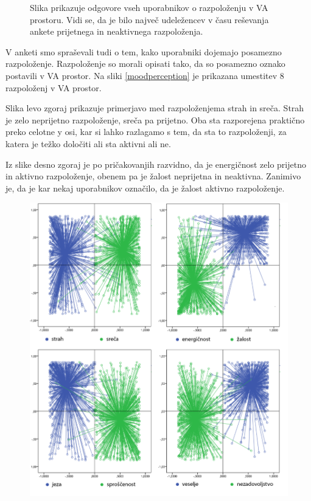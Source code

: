 \documentclass[a4paper, 12pt]{book}
\begin{document}
{\begin{figure}[hbt]
\caption{Slika prikazuje odgovore vseh uporabnikov o razpoloženju v VA prostoru. Vidi se, da je bilo največ udeležencev v času reševanja ankete prijetnega in neaktivnega razpoloženja.  }
\label{razpolozenjeva}
\end{figure}

V anketi smo spraševali tudi o tem, kako uporabniki dojemajo posamezno razpoloženje. Razpoloženje so morali opisati tako, da so posamezno oznako postavili v VA prostor. Na sliki \ref{moodperception} je prikazana umestitev 8 razpoloženj v VA prostor. 

Slika levo zgoraj prikazuje primerjavo med razpoloženjema strah in sreča. Strah je zelo neprijetno razpoloženje, sreča pa prijetno. Oba sta razporejena praktično preko celotne y osi, kar si lahko razlagamo s tem, da sta to razpoloženji, za katera je težko določiti ali sta aktivni ali ne. 

Iz slike desno zgoraj je po pričakovanjih razvidno, da je energičnost zelo prijetno in aktivno razpoloženje, obenem pa je žalost neprijetna in neaktivna. Zanimivo je, da je kar nekaj uporabnikov označilo, da je žalost aktivno razpoloženje.

\begin{figure}[!hbt]
\centering
\includegraphics[width=12cm]{images/vamoodlables.png}


\end{figure}}
\end{document}
